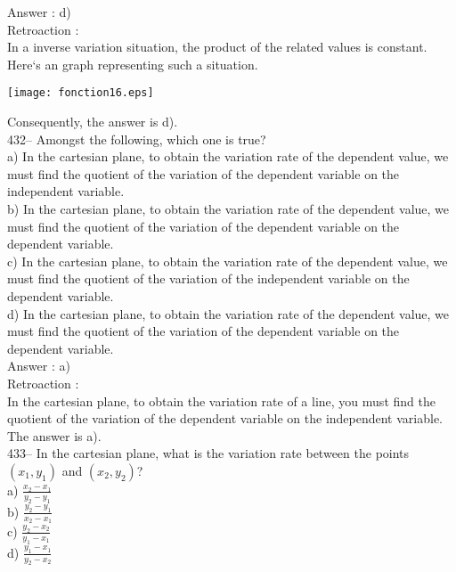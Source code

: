 ﻿\documentclass[letterpaper, 12pt]{article}
\begin{document}
Answer :  d)\\

Retroaction : \\
In a inverse variation situation, the product of the related values
is constant. Here`s an graph representing such a situation.\\
    \begin{center}
    \texttt{[image: fonction16.eps]}
    \end{center}

Consequently, the answer is d).\\




432-- Amongst the following, which one is true?\\
a) In the cartesian plane, to obtain the variation rate of the dependent value, we must find the quotient of the variation of the
dependent variable on the independent variable.\\
b) In the cartesian plane, to obtain the variation rate of the dependent value, we must find the quotient of the variation of the
dependent variable on the dependent variable.\\
c) In the cartesian plane, to obtain the variation rate of the dependent value, we must find the quotient of the variation of the
independent variable on the dependent variable.\\
d) In the cartesian plane, to obtain the variation rate of the dependent value, we must find the quotient of the variation of the
dependent variable on the dependent variable.\\

Answer :  a)\\

Retroaction : \\
In the cartesian plane, to obtain the variation rate of a line, you must find the quotient of the variation of the dependent variable on the independent variable.  The answer is a).\\

433-- In the cartesian plane, what is the variation rate between the points $\left( x_1,y_1\right)$ and $\left( x_2,y_2\right) $?\\
a) $\frac{x_2-x_1}{y_2-y_1}$\\[2mm]
b) $\frac{y_2-y_1}{x_2-x_1}$\\[2mm]
c) $\frac{y_2-x_2}{y_1-x_1}$\\[2mm]
d) $\frac{y_1-x_1}{y_2-x_2}$\\[2mm]
\end{document}

